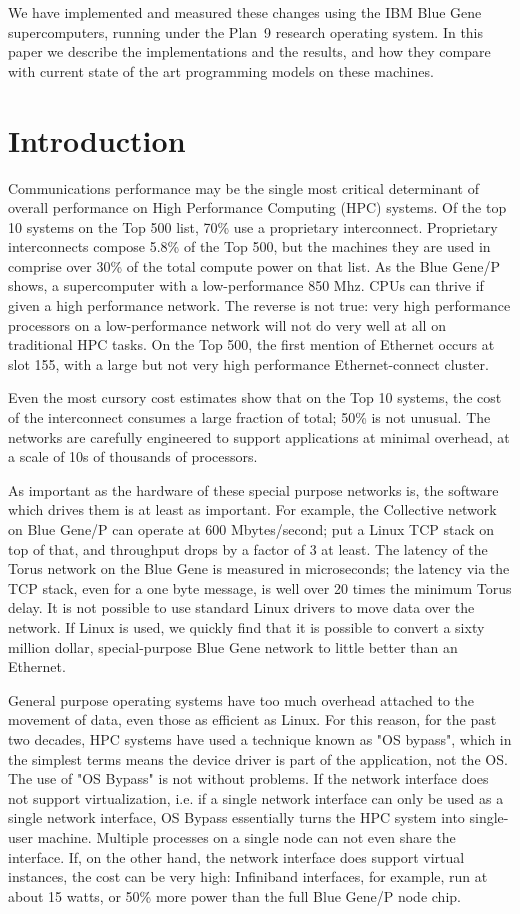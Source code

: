 \documentclass[letterpaper,twocolumn,10pt]{article}
\begin{document}
We have implemented and measured these changes using the IBM Blue Gene supercomputers, running under the Plan~9 research operating system. 
In this paper we describe the implementations and the results, and how they compare with current state of the art programming models on these machines. 

\section{Introduction}
Communications performance may be the single most critical determinant of overall performance on High Performance Computing (HPC) systems. Of the top 10 systems on the Top 500 list, 70\% use a proprietary interconnect. Proprietary interconnects compose 5.8\% of the Top 500, but the machines they are used in comprise over 30\% of the total compute power on that list. 
As the Blue Gene/P shows, a supercomputer with a low-performance 850 Mhz. CPUs can thrive if given a high performance network. The reverse is not true: very high performance processors on a low-performance network will not do very well at all on traditional HPC tasks. On the Top 500, the first 
mention of Ethernet occurs at slot 155, with a large but not very high performance Ethernet-connect cluster. 

Even the most cursory cost estimates show that on the Top 10 systems, the cost of the interconnect consumes a large fraction of total; 50\% is not unusual. The networks are carefully engineered to support applications at minimal overhead, at a scale of 10s of thousands of processors. 

As important as the hardware of these special purpose networks is, the software which drives them is at least as important. For example, the Collective network on Blue Gene/P can operate at 600 Mbytes/second; put a Linux TCP stack on top of that, and throughput
drops by a factor of 3 at least. The latency of the Torus network on the Blue Gene is measured in microseconds; the latency via the TCP stack, even for a one byte message, is well over 20 times the minimum Torus delay. It is not possible to use standard Linux drivers to move data over the network. 
If Linux is used, we quickly find that it is possible to convert a sixty million dollar, special-purpose Blue Gene network to little better than an Ethernet. 

General purpose operating systems have too much overhead attached to the movement of data, even those as efficient as Linux. 
For this reason, for the past two decades, HPC systems have used a technique known as "OS bypass", which in the simplest terms means the device driver is part of the application, not the OS. 
The use of "OS Bypass" is not without problems. If the network interface does not support virtualization, i.e. if a single network interface can only be used as a single network interface, OS Bypass essentially turns
the HPC system into single-user machine. Multiple processes on a single node can not even share the interface. If, on the other hand, the network interface does support virtual instances, the cost can be very high: 
Infiniband interfaces, for example, run at about 15 watts, or 50\% more power than the full Blue Gene/P node chip. 
\end{document}
